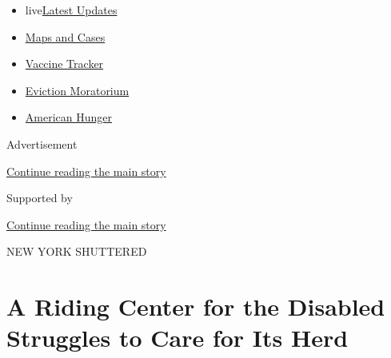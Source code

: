 \begin{itemize}
\tightlist
\item
  live\href{https://www.nytimes3xbfgragh.onion/2020/09/08/world/covid-19-coronavirus.html?name=styln-coronavirus-national\&region=TOP_BANNER\&block=storyline_menu_recirc\&action=click\&pgtype=Article\&impression_id=de720f80-f1f5-11ea-b189-9baa8bf07aac\&variant=undefined}{Latest
  Updates}
\item
  \href{https://www.nytimes3xbfgragh.onion/interactive/2020/us/coronavirus-us-cases.html?name=styln-coronavirus-national\&region=TOP_BANNER\&block=storyline_menu_recirc\&action=click\&pgtype=Article\&impression_id=de720f81-f1f5-11ea-b189-9baa8bf07aac\&variant=undefined}{Maps
  and Cases}
\item
  \href{https://www.nytimes3xbfgragh.onion/interactive/2020/science/coronavirus-vaccine-tracker.html?name=styln-coronavirus-national\&region=TOP_BANNER\&block=storyline_menu_recirc\&action=click\&pgtype=Article\&impression_id=de720f82-f1f5-11ea-b189-9baa8bf07aac\&variant=undefined}{Vaccine
  Tracker}
\item
  \href{https://www.nytimes3xbfgragh.onion/2020/09/02/your-money/eviction-moratorium-covid.html?name=styln-coronavirus-national\&region=TOP_BANNER\&block=storyline_menu_recirc\&action=click\&pgtype=Article\&impression_id=de720f83-f1f5-11ea-b189-9baa8bf07aac\&variant=undefined}{Eviction
  Moratorium}
\item
  \href{https://www.nytimes3xbfgragh.onion/interactive/2020/09/02/magazine/food-insecurity-hunger-us.html?name=styln-coronavirus-national\&region=TOP_BANNER\&block=storyline_menu_recirc\&action=click\&pgtype=Article\&impression_id=de720f84-f1f5-11ea-b189-9baa8bf07aac\&variant=undefined}{American
  Hunger}
\end{itemize}

Advertisement

\protect\hyperlink{after-top}{Continue reading the main story}

Supported by

\protect\hyperlink{after-sponsor}{Continue reading the main story}

NEW YORK SHUTTERED

\hypertarget{a-riding-center-for-the-disabled-struggles-to-care-for-its-herd}{%
\section{A Riding Center for the Disabled Struggles to Care for Its
Herd}\label{a-riding-center-for-the-disabled-struggles-to-care-for-its-herd}}

